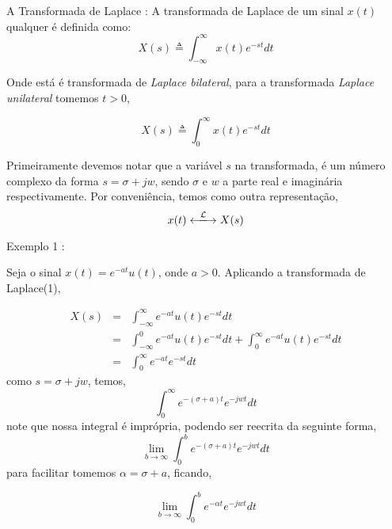 \documentclass[9pt]{beamer}
\begin{document}
\begin{frame}{ A Transformada de Laplace :}
  \justifying
  A transformada de Laplace de um sinal $x(t)$  qualquer \'{e} definida como:
  \begin{equation}
    X(s)  \triangleq \int_{-\infty}^{\infty} x(t)e^{-st} dt
  \end{equation}
  \par
  Onde est\'{a} \'{e} transformada de \textit{Laplace bilateral}, para a transformada  \textit{Laplace unilateral} tomemos  $t > 0$,
  \par
  \begin{equation}
    X(s) \triangleq \int_{0}^{\infty} x(t)e^{-st} dt
  \end{equation}
  \par
  Primeiramente devemos notar que a vari\'{a}vel $s$  na transformada, \'{e} um n\'{u}mero complexo da forma $s = \sigma + jw$, 
  sendo $\sigma$ e $w$ a parte  real e imagin\'{a}ria respectivamente. Por conveni\^{e}ncia, temos como outra representa\c{c}\~{a}o,
  $$x(t) \xlongleftrightarrow{\mathcal{L}} X(s)$$
\end{frame}
\begin{frame}
  \justifying
  Exemplo 1 :
  \par
  Seja o sinal $ x(t) = e^{-at}u(t)$, onde $ a > 0$.  Aplicando a transformada de Laplace(1),
  \par
  \begin{eqnarray} 
    X(s) & = &  \int_{-\infty}^{\infty} e^{-at} u(t)e^{-st} dt \nonumber \\
    & =  & \int_{-\infty}^{0} e^{-at} u(t)e^{-st} dt + \int_{0}^{\infty}e^{-at} u(t) e^{-st} dt \nonumber \\ 
    & = & \int_{0}^{\infty} e^{-at} e^{-st} dt \nonumber  
  \end{eqnarray}
  \newline 
  como $ s = \sigma + jw $, temos,  
  $$ \int_{0}^{\infty} e^{-(\sigma + a )t} e^{-jwt} dt $$
  \newline 
  note que nossa integral \'{e} impr\'{o}pria, podendo ser reecrita da seguinte forma, 
  $$ \lim_{b\rightarrow\infty} {\int_{0}^{b} e^{-(\sigma + a)t} e^{-jwt}} dt $$ 
  \newline 
  para facilitar tomemos $ \alpha = \sigma + a$, ficando, 
  \par
  $$ \lim_{b\rightarrow\infty} {\int_{0}^{b} e^{-\alpha t} e^{-jwt}} dt $$ 
\end{frame}
\end{document}
